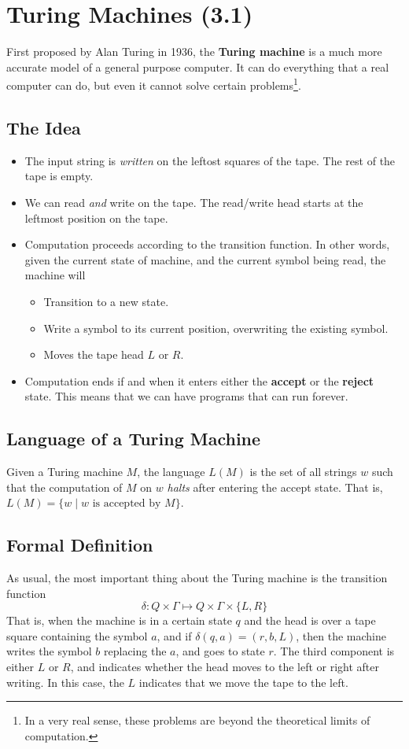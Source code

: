 \documentclass[letterpaper]{article}
\begin{document}
\newpage 
\section{Turing Machines (3.1)}
First proposed by Alan Turing in 1936, the \textbf{Turing machine} is a much more accurate model of a general purpose computer. It can do everything that a real computer can do, but even it cannot solve certain problems\footnote{In a very real sense, these problems are beyond the theoretical limits of computation.}.

\subsection{The Idea}
\begin{itemize}
    \item The input string is \emph{written} on the leftost squares of the tape. The rest of the tape is empty. 
    \item We can read \emph{and} write on the tape. The read/write head starts at the leftmost position on the tape. 
    \item Computation proceeds according to the transition function. In other words, given the current state of machine, and the current symbol being read, the machine will 
    \begin{itemize}
        \item Transition to a new state.
        \item Write a symbol to its current position, overwriting the existing symbol.
        \item Moves the tape head $L$ or $R$. 
    \end{itemize}
    \item Computation ends if and when it enters either the \textbf{accept} or the \textbf{reject} state. This means that we can have programs that can run forever. 
\end{itemize}

\subsection{Language of a Turing Machine}
Given a Turing machine $M$, the language $L(M)$ is the set of all strings $w$ such that the computation of $M$ on $w$ \emph{halts} after entering the accept state. That is, $L(M) = \{w \mid w \text{ is accepted by } M\}$.

\subsection{Formal Definition}
As usual, the most important thing about the Turing machine is the transition function 
\[\delta: Q \times \Gamma \mapsto Q \times \Gamma \times \{L, R\}\]
That is, when the machine is in a certain state $q$ and the head is over a tape square containing the symbol $a$, and if $\delta(q, a) = (r, b, L)$, then the machine writes the symbol $b$ replacing the $a$, and goes to state $r$. The third component is either $L$ or $R$, and indicates whether the head moves to the left or right after writing. In this case, the $L$ indicates that we move the tape to the left. 
\end{document}
